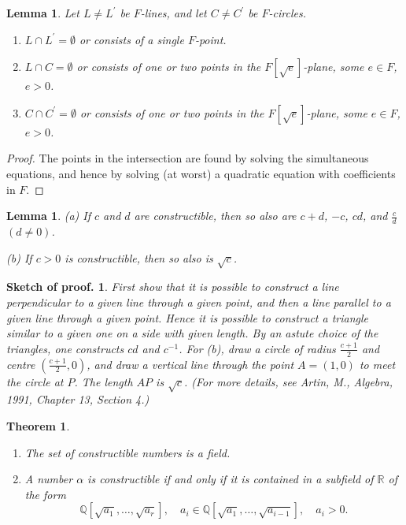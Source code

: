 \documentclass[a4paper,11pt,final,openany]{memoir}
\newtheorem{lemma}[X]{Lemma}
\newtheorem{theorem}[X]{Theorem}
\theoremstyle{nonumberplain}
\newtheorem{proof}{Proof.}
\newtheorem{sproof}{Sketch of proof.}
\begin{document}
\begin{lemma}
\label{ef24} Let $L\neq L^{\prime}$ be $F$-lines, and let $C\neq C^{\prime} $
be $F$-circles.

\begin{enumerate}
\item $L\cap L^{\prime}=\emptyset$ or consists of a single $F$-point.

\item $L\cap C=\emptyset$ or consists of one or two points in the $F[\sqrt
{e}]$-plane, some $e\in F$, $e>0$.

\item $C\cap C^{\prime}=\emptyset$ or consists of one or two points in the
$F[\sqrt{e}]$-plane, some $e\in F$, $e>0$.
\end{enumerate}
\end{lemma}

\begin{proof}
The points in the intersection are found by solving the simultaneous
equations, and hence by solving (at worst) a quadratic equation with
coefficients in $F$.
\end{proof}

\begin{lemma}
\label{ef25} (a) If $c$ and $d$ are constructible, then so also are $c+d$,
$-c$, $cd$, and $\frac{c}{d}$ $(d\neq0)$.

(b) If $c>0$ is constructible, then so also is $\sqrt c$.
\end{lemma}

\begin{sproof}
First show that it is possible to construct a line perpendicular to a given
line through a given point, and then a line parallel to a given line through a
given point. Hence it is possible to construct a triangle similar to a given
one on a side with given length. By an astute choice of the triangles, one
constructs $cd$ and $c^{-1}$. For (b), draw a circle of radius $\frac{c+1}{2}$
and centre $(\frac{c+1}{2},0)$, and draw a vertical line through the point
$A=(1,0)$ to meet the circle at $P$. The length $AP$ is $\sqrt{c}$. (For more
details, see Artin, M., Algebra, 1991, Chapter 13, Section 4.)
\end{sproof}

\begin{theorem}
\label{ef26}%
%


\begin{enumerate}
\item The set of constructible numbers is a field.

\item A number $\alpha$ is constructible if and only if it is contained in a
subfield of $\mathbb{R}{}$ of the form
\[
\mathbb{Q}{}[\sqrt{a_{1}},\ldots,\sqrt{a_{r}}],\quad a_{i}\in\mathbb{Q}%
{}[\sqrt{a_{1}},\ldots,\sqrt{a_{i-1}}],\quad a_{i}>0\text{.}%
\]

\end{enumerate}
\end{theorem}
\end{document}
